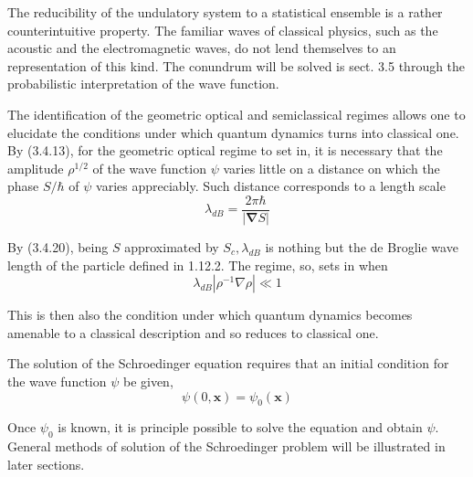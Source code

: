\documentclass{article}
\begin{document}
The reducibility of the undulatory system to a statistical ensemble is a rather counterintuitive property. The familiar waves of classical physics, such as the acoustic and the electromagnetic waves, do not lend themselves to an representation of this kind. The conundrum will be solved is sect. 3.5 through the probabilistic interpretation of the wave function.

The identification of the geometric optical and semiclassical regimes allows one to elucidate the conditions under which quantum dynamics turns into classical one. By (3.4.13), for the geometric optical regime to set in, it is necessary that the amplitude $\rho^{1 / 2}$ of the wave function $\psi$ varies little on a distance on which the phase $S / \hbar$ of $\psi$ varies appreciably. Such distance corresponds to a length scale
$$
\begin{equation*}
\lambda_{d B}=\frac{2 \pi \hbar}{|\boldsymbol{\nabla} S|} \tag{3.4.22}
\end{equation*}
$$

By (3.4.20), being $S$ approximated by $S_{c}, \lambda_{d B}$ is nothing but the de Broglie wave length of the particle defined in 1.12.2. The regime, so, sets in when
$$
\begin{equation*}
\lambda_{d B}\left|\rho^{-1} \nabla \rho\right| \ll 1 \tag{3.4.23}
\end{equation*}
$$

This is then also the condition under which quantum dynamics becomes amenable to a classical description and so reduces to classical one.

The solution of the Schroedinger equation requires that an initial condition for the wave function $\psi$ be given,
$$
\begin{equation*}
\psi(0, \boldsymbol{x})=\psi_{0}(\boldsymbol{x}) \tag{3.4.24}
\end{equation*}
$$

Once $\psi_{0}$ is known, it is principle possible to solve the equation and obtain $\psi$. General methods of solution of the Schroedinger problem will be illustrated in later sections.
\end{document}

